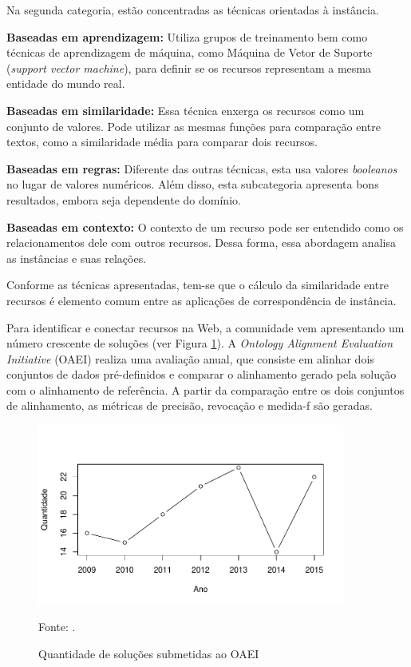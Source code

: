 Na segunda categoria, estão concentradas as técnicas orientadas à instância. 

\textbf{Baseadas em aprendizagem:} Utiliza grupos de treinamento bem como técnicas de aprendizagem de máquina, como Máquina de Vetor de Suporte (\textit{support vector machine}), para definir se os recursos representam a mesma entidade do mundo real.

\textbf{Baseadas em similaridade:} Essa técnica enxerga os recursos como um conjunto de valores. Pode utilizar as mesmas funções para comparação entre textos, como a similaridade média para comparar dois recursos. 

\textbf{Baseadas em regras:} Diferente das outras técnicas, esta usa valores \textit{booleanos} no lugar de valores numéricos. Além disso, esta subcategoria apresenta bons resultados, embora seja dependente do domínio. 

\textbf{Baseadas em contexto:} O contexto de um recurso pode ser entendido como os relacionamentos dele com outros recursos. Dessa forma, essa abordagem analisa as instâncias e suas relações.

Conforme as técnicas apresentadas, tem-se que o cálculo da similaridade entre recursos é elemento comum entre as aplicações de correspondência de instância.

Para identificar e conectar recursos na Web, a comunidade vem apresentando um número crescente de soluções (ver Figura \ref{fig:oaei_imtools}). A \textit{Ontology Alignment Evaluation Initiative} (OAEI) realiza uma avaliação anual, que consiste em alinhar dois conjuntos de dados pré-definidos e comparar o alinhamento gerado pela solução com o alinhamento de referência. A partir da comparação entre os dois conjuntos de alinhamento, as métricas de precisão, revocação e medida-f são geradas.


\begin{figure}[!h]
        \centering
        \includegraphics[width=0.9\textwidth]{./imagens/im_tools.pdf}
    \caption{Quantidade de soluções submetidas ao OAEI}
        \footnotesize{Fonte: \cite{cheatham2015results}.}
        \label{fig:oaei_imtools}
\end{figure}

